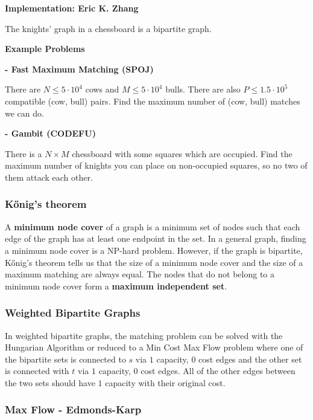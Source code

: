 \textbf{Implementation: Eric K. Zhang}

\begin{remark}
  The knights' graph in a chessboard is a bipartite graph.
\end{remark}

\textbf{Example Problems}

\begin{problem}
  \textbf{- Fast Maximum Matching (SPOJ)} \cite{SPOJ_MATCHING}

  There are $N \leq 5 \cdot 10^4$ cows and $M \leq 5 \cdot 10^4$ bulls.
  There are also $P \leq 1.5 \cdot 10^5$ compatible (cow, bull) pairs.
  Find the maximum number of (cow, bull) matches we can do.
\end{problem}

\begin{problem}
  \textbf{- Gambit (CODEFU)} \cite{CodeFuGambit}

  There is a $N \times M$ chessboard with some squares which are occupied.
  Find the maximum number of knights you can place on non-occupied squares, so no two of them
  attack each other.
\end{problem}

\subsubsection{Kőnig's theorem}
A \textbf{minimum node cover} of a graph is a minimum set of nodes such that each
edge of the graph has at least one endpoint in the set. In a general graph, finding
a minimum node cover is a NP-hard problem. However, if the graph is bipartite,
Kőnig's theorem tells us that the size of a minimum node cover and the size
of a maximum matching are always equal. The nodes that do not belong to a minimum
node cover form a \textbf{maximum independent set}.

\subsubsection{Weighted Bipartite Graphs}
In weighted bipartite graphs, the matching problem 
can be solved with the Hungarian Algorithm or 
reduced to a Min Cost Max Flow problem where one of the bipartite sets
is connected to $s$ via $1$ capacity, $0$ cost edges and the other
set is connected with $t$ via $1$ capacity, $0$ cost edges.
All of the other edges between the two sets should have $1$ capacity with their original cost.

\newpage
\subsubsection{Max Flow - Edmonds-Karp}

